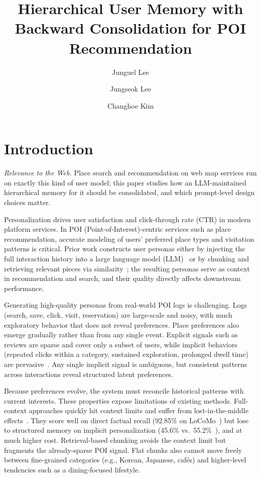 \documentclass[sigconf,review,anonymous]{acmart}
\title{Hierarchical User Memory with Backward Consolidation for POI Recommendation}
\author{Junguel Lee}
\affiliation{%
  \institution{Naver Corp}
  \city{Seongnam-si}
  \country{South Korea}
}
\author{Jungseok Lee}
\affiliation{%
  \institution{Naver Corp}
  \city{Seongnam-si}
  \country{South Korea}
}
\author{Changhoe Kim}
\affiliation{%
  \institution{Naver Corp}
  \city{Seongnam-si}
  \country{South Korea}
}
\begin{document}
\maketitle


\section{Introduction}

\emph{Relevance to the Web.} Place search and recommendation on web map services run on exactly this kind of user model; this paper studies how an LLM-maintained hierarchical memory for it should be consolidated, and which prompt-level design choices matter.

Personalization drives user satisfaction and click-through rate (CTR) in modern platform services. In POI (Point-of-Interest)-centric services such as place recommendation, accurate modeling of users' preferred place types and visitation patterns is critical. Prior work constructs user personas either by injecting the full interaction history into a large language model (LLM)~\cite{beyond-context-window} or by chunking and retrieving relevant pieces via similarity~\cite{dpr,contriever}; the resulting personas serve as context in recommendation and search, and their quality directly affects downstream performance.

Generating high-quality personas from real-world POI logs is challenging. Logs (search, save, click, visit, reservation) are large-scale and noisy, with much exploratory behavior that does not reveal preferences. Place preferences also emerge gradually rather than from any single event. Explicit signals such as reviews are sparse and cover only a subset of users, while implicit behaviors (repeated clicks within a category, sustained exploration, prolonged dwell time) are pervasive~\cite{proex}. Any single implicit signal is ambiguous, but consistent patterns across interactions reveal structured latent preferences.

Because preferences evolve, the system must reconcile historical patterns with current interests. These properties expose limitations of existing methods. Full-context approaches quickly hit context limits and suffer from lost-in-the-middle effects~\cite{lost-in-the-middle}. They score well on direct factual recall (92.85\% on LoCoMo~\cite{beyond-context-window}) but lose to structured memory on implicit personalization (45.6\% vs.\ 55.2\%~\cite{personamem-v2}), and at much higher cost. Retrieval-based chunking avoids the context limit but fragments the already-sparse POI signal. Flat chunks also cannot move freely between fine-grained categories (e.g., Korean, Japanese, caf\'{e}s) and higher-level tendencies such as a dining-focused lifestyle.
\end{document}
